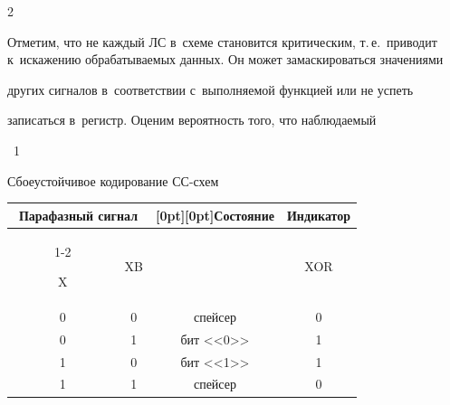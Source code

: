 \begin{multicols}{2}
  

  Отметим, что не каждый ЛС в~схеме становится критическим, т.\,е.\ приводит к~искажению обрабатываемых данных. Он может замаскироваться значениями 

других сигналов в~соответствии с~выполняемой функцией или не успеть 

записаться в~регистр. Оценим вероятность того, что наблюдаемый\linebreak\vspace*{-12pt}



\begin{center}

{{\tablename~1}\ \ \small{

Сбоеустойчивое кодирование СС-схем

}}



\vspace*{6pt}



{\small

\begin{tabular}{|c|c|c|c|}

\hline

\multicolumn{2}{|c|}{Парафазный сигнал}&

\multicolumn{1}{c|}{\raisebox{-6pt}[0pt][0pt]{Состояние}}&Индикатор \\

\cline{1-2}

\ \ \ \ \ \ \ X\ \ \ \ \ \ \ &XB&&XOR\\

\hline

0&0&спейсер&0\\

0&1&бит <<0>>&1\\

1&0&бит <<1>>&1\\

1&1&спейсер&0\\

\hline

\end{tabular}}

\end{center}





\end{multicols}
